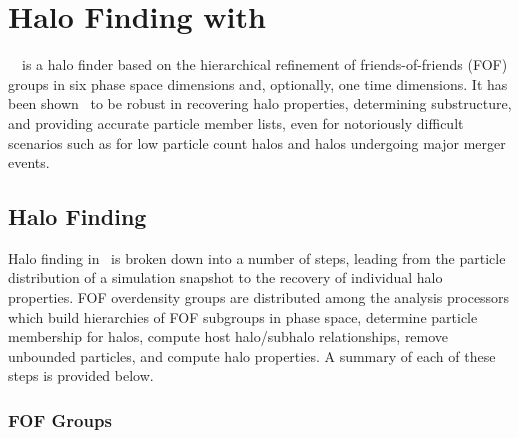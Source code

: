
%
%

\section{Halo Finding with \rockstar}
\label{sec:rockstar}



\rockstar\ \citep[Robust Overdensity Calculation using K-Space Topoloogically Adaptive Refinement; ][]{}\cn\ is a halo finder based on the hierarchical refinement of friends-of-friends (FOF) groups in six phase space dimensions and, optionally, one time dimensions.  It has been shown \cn\ to be robust in recovering halo properties, determining substructure, and providing accurate particle member lists, even for notoriously difficult scenarios such as for low particle count halos and halos undergoing major merger events.




\subsection{Halo Finding}
\label{subsec:rockstar--halo_finding}


Halo finding in \rockstar\ is broken down into a number of steps, leading from the particle distribution of a simulation snapshot to the recovery of individual halo properties.  FOF overdensity groups are distributed among the analysis processors which build hierarchies of FOF subgroups in phase space, determine particle membership for halos, compute host halo/subhalo relationships, remove unbounded particles, and compute halo properties.  A summary of each of these steps is provided below.



\subsubsection{FOF Groups}
\label{subsubsec:rockstar--halo_finding--fof_groups}



